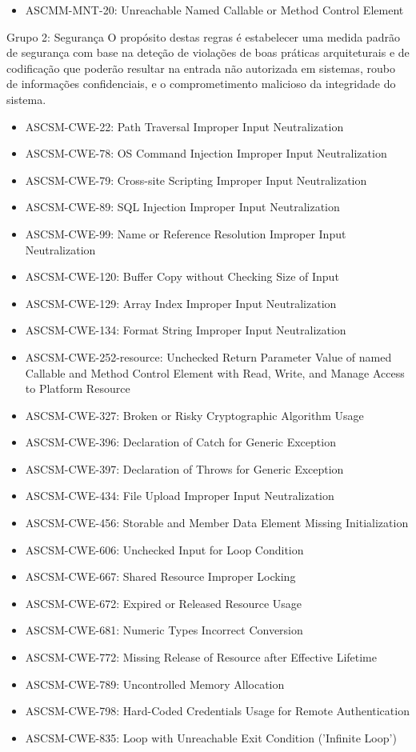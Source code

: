 \documentclass[openany,10pt,a4paper]{article}
\begin{document}
\begin{appendix}
\begin{samepage}
\begin{itemize}[]
	\item ASCMM-MNT-20: Unreachable Named Callable or Method Control Element
\end{itemize}
\end{samepage}
Grupo 2: Segurança
O propósito destas regras é estabelecer uma medida padrão de segurança com base na deteção de violações de boas práticas arquiteturais e de codificação que poderão resultar na entrada não autorizada em sistemas, roubo de informações confidenciais, e o comprometimento malicioso da integridade do sistema.
\begin{itemize}
	\setlength\itemsep{0em}
	\item ASCSM-CWE-22: Path Traversal Improper Input Neutralization
	\item ASCSM-CWE-78: OS Command Injection Improper Input Neutralization
	\item ASCSM-CWE-79: Cross-site Scripting Improper Input Neutralization
	\item ASCSM-CWE-89: SQL Injection Improper Input Neutralization
	\item ASCSM-CWE-99: Name or Reference Resolution Improper Input Neutralization
	\item ASCSM-CWE-120: Buffer Copy without Checking Size of Input
	\item ASCSM-CWE-129: Array Index Improper Input Neutralization
	\item ASCSM-CWE-134: Format String Improper Input Neutralization
	\item ASCSM-CWE-252-resource: Unchecked Return Parameter Value of named Callable and Method Control Element with Read, Write, and Manage Access to Platform Resource
	\item ASCSM-CWE-327: Broken or Risky Cryptographic Algorithm Usage
	\item ASCSM-CWE-396: Declaration of Catch for Generic Exception
	\item ASCSM-CWE-397: Declaration of Throws for Generic Exception
	\item ASCSM-CWE-434: File Upload Improper Input Neutralization
	\item ASCSM-CWE-456: Storable and Member Data Element Missing Initialization
	\item ASCSM-CWE-606: Unchecked Input for Loop Condition
	\item ASCSM-CWE-667: Shared Resource Improper Locking
	\item ASCSM-CWE-672: Expired or Released Resource Usage
	\item ASCSM-CWE-681: Numeric Types Incorrect Conversion
	\item ASCSM-CWE-772: Missing Release of Resource after Effective Lifetime
	\item ASCSM-CWE-789: Uncontrolled Memory Allocation
	\item ASCSM-CWE-798: Hard-Coded Credentials Usage for Remote Authentication
	\item ASCSM-CWE-835: Loop with Unreachable Exit Condition ('Infinite Loop')
\end{itemize} 


\end{appendix}
\end{document}
